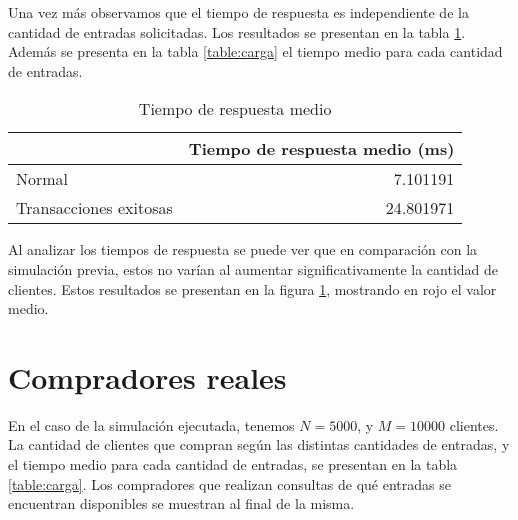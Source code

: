 Una vez más observamos que el tiempo de respuesta es independiente de la cantidad de entradas solicitadas.
Los resultados se presentan en la tabla \ref{table:carga2}.
Además se presenta en la tabla \ref{table:carga} el tiempo medio para cada cantidad de entradas.
\begin{table}[H]
\centering
\begin{tabular}{l|r}
	{} &  Tiempo de respuesta medio (ms) \\
	\hline
Normal & 7.101191 \\
Transacciones exitosas  & 24.801971 \\
\end{tabular}
\caption{Tiempo de respuesta medio}
\label{table:carga2}
\end{table}

Al analizar los tiempos de respuesta se puede ver que en comparación con la simulación previa, estos no varían al aumentar significativamente la cantidad de clientes.
Estos resultados se presentan en la figura \ref{fig:respuesta_carga}, mostrando en rojo el valor medio.

\begin{figure}[H]
\label{fig:respuesta_carga}
\end{figure}

\section{Compradores reales}

En el caso de la simulación ejecutada, tenemos \(N = 5000\), y \(M = 10000\) clientes. La cantidad de clientes que compran según
las distintas cantidades de entradas, y el tiempo medio para cada cantidad de entradas, se presentan en la tabla \ref{table:carga}.
Los compradores que realizan consultas de qué entradas se encuentran disponibles se muestran al final de la misma.

